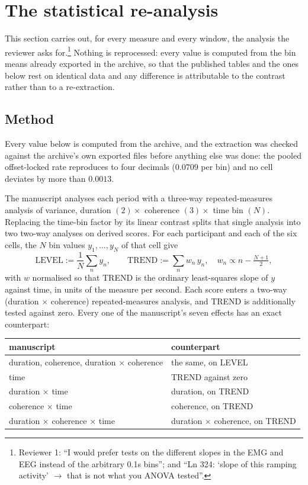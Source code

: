\documentclass[a4paper,11pt]{article}
\newcommand{\RR}[1]{\textcolor{refcol}{#1}}
\newcommand{\refnote}[1]{\footnote{\textcolor{refcol}{\textsf{\footnotesize #1}}}}
\newcommand{\1}{\mathbbm{1}}
\begin{document}
\section{The statistical re-analysis}
\label{sec:reanalysis}

\RR{This section carries out, for every measure and every window, the analysis the
reviewer asks for.}\refnote{Reviewer 1: ``I would prefer tests on the different slopes
in the EMG and EEG instead of the arbitrary 0.1s bins''; and ``Ln 324: `slope of this
ramping activity' $\rightarrow$ that is not what you ANOVA tested''.} \RR{Nothing is
reprocessed: every value is computed from the bin means already exported in the
archive, so that the published tables and the ones below rest on identical data and
any difference is attributable to the contrast rather than to a re-extraction.}

\subsection{Method}

Every value below is computed from the archive, and the extraction was checked against
the archive's own exported files before anything else was done: the pooled offset-locked
rate reproduces to four decimals ($0.0709$ per bin) and no cell deviates by more than
$0.0013$.



The manuscript analyses each period with a three-way repeated-measures analysis of
variance, duration $(2)\times$ coherence $(3)\times$ time bin $(N)$. Replacing the
time-bin factor by its linear contrast splits that single analysis into two two-way
analyses on derived scores. For each participant and each of the six cells, the $N$ bin
values $y_1,\dots,y_N$ of that cell give
\begin{equation}
\mathrm{LEVEL}:=\frac1N\sum_n y_n,
\qquad
\mathrm{TREND}:=\sum_n w_n\,y_n,
\quad w_n\propto n-\tfrac{N+1}{2},
\end{equation}
with $w$ normalised so that TREND is the ordinary least-squares slope of $y$ against
time, in units of the measure per second. Each score enters a two-way (duration
$\times$ coherence) repeated-measures analysis, and TREND is additionally tested
against zero. Every one of the manuscript's seven effects has an exact counterpart:

\begin{center}
\begin{tabular}{ll}
\toprule
manuscript & counterpart\\
\midrule
duration, coherence, duration $\times$ coherence & the same, on LEVEL\\
time & TREND against zero\\
duration $\times$ time & duration, on TREND\\
coherence $\times$ time & coherence, on TREND\\
duration $\times$ coherence $\times$ time & duration $\times$ coherence, on TREND\\
\bottomrule
\end{tabular}
\end{center}
\end{document}
